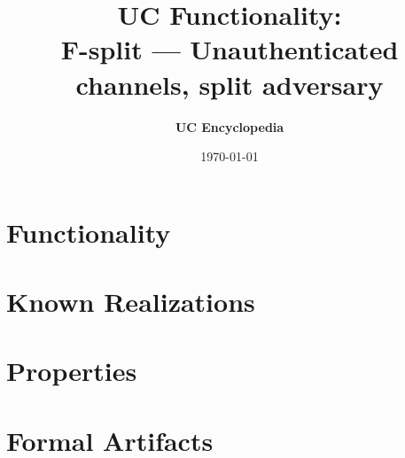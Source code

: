 \documentclass[11pt,a4paper]{article}
\title{\textbf{\Large UC Functionality:}\\[0.2em] \Large F-split --- Unauthenticated channels, split adversary}
\author{\textbf{UC Encyclopedia}}
\date{\today}
\newtheorem{functionality}{Functionality}
\begin{document}
\maketitle

\begin{abstract}
\end{abstract}

\section{Functionality}

%

\section{Known Realizations}


\section{Properties}


\section{Formal Artifacts}

\end{document}
